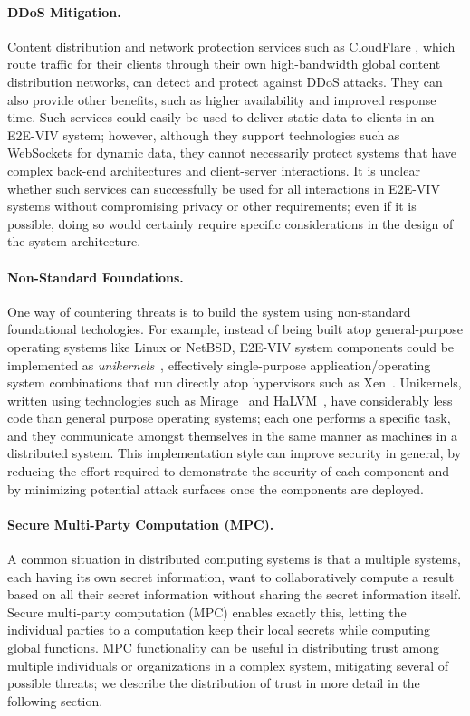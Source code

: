 \paragraph{DDoS Mitigation.} Content distribution and network
protection services such as CloudFlare \cite{CloudFlare}, which route
traffic for their clients through their own high-bandwidth global
content distribution networks, can detect and protect against DDoS
attacks. They can also provide other benefits, such as higher
availability and improved response time. Such services could easily be
used to deliver static data to clients in an E2E-VIV system; however,
although they support technologies such as WebSockets for dynamic
data, they cannot necessarily protect systems that have complex
back-end architectures and client-server interactions. It is unclear
whether such services can successfully be used for all interactions in
E2E-VIV systems without compromising privacy or other requirements;
even if it is possible, doing so would certainly require specific
considerations in the design of the system architecture.

\paragraph{Non-Standard Foundations.} One way of countering threats is
to build the system using non-standard foundational techologies. For
example, instead of being built atop general-purpose operating systems
like Linux or NetBSD, E2E-VIV system components could be implemented as
\emph{unikernels}~\cite{Madhavapeddy13}, effectively single-purpose
application/operating system combinations that run directly atop
hypervisors such as Xen~\cite{Xen}. Unikernels, written using
technologies such as Mirage~\cite{OpenMirage} and HaLVM~\cite{HaLVM},
have considerably less code than general purpose operating systems;
each one performs a specific task, and they communicate amongst
themselves in the same manner as machines in a distributed
system. This implementation style can improve security in general, by
reducing the effort required to demonstrate the security of each
component and by minimizing potential attack surfaces once the
components are deployed. 

\paragraph{Secure Multi-Party Computation (MPC).} A common situation
in distributed computing systems is that a multiple systems, each
having its own secret information, want to collaboratively compute a
result based on all their secret information without sharing the
secret information itself. Secure multi-party computation (MPC)
enables exactly this, letting the individual parties to a computation
keep their local secrets while computing global functions. MPC
functionality can be useful in distributing trust among multiple
individuals or organizations in a complex system, mitigating several
of possible threats; we describe the distribution of trust in more
detail in the following section.


